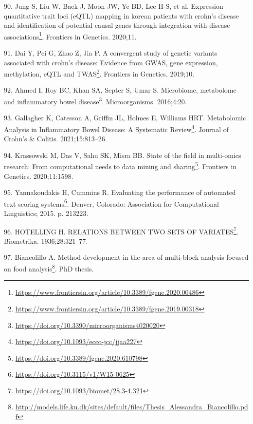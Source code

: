 \documentclass[
  a4paper,
]{book}
\DeclareRobustCommand{\href}[2]{#2\footnote{\url{#1}}}
\newlength{\cslhangindent}
\newlength{\cslentryspacingunit} %
\newenvironment{CSLReferences}[2] %
 {%
  \setlength{\parindent}{0pt}
  \ifodd #1
  \let\oldpar\par
  \def\par{\hangindent=\cslhangindent\oldpar}
  \fi
  \setlength{\parskip}{#2\cslentryspacingunit}
 }%
 {}
\begin{document}
\begin{CSLReferences}{0}{0}
\leavevmode{}%
90. Jung S, Liu W, Baek J, Moon JW, Ye BD, Lee H-S, et al. \href{https://www.frontiersin.org/article/10.3389/fgene.2020.00486}{Expression quantitative trait loci (eQTL) mapping in korean patients with crohn{'}s disease and identification of potential causal genes through integration with disease associations}. Frontiers in Genetics. 2020;11.

\leavevmode{}%
91. Dai Y, Pei G, Zhao Z, Jia P. \href{https://www.frontiersin.org/article/10.3389/fgene.2019.00318}{A convergent study of genetic variants associated with crohn{'}s disease: Evidence from GWAS, gene expression, methylation, eQTL and TWAS}. Frontiers in Genetics. 2019;10.

\leavevmode{}%
92. Ahmed I, Roy BC, Khan SA, Septer S, Umar S. \href{https://doi.org/10.3390/microorganisms4020020}{Microbiome, metabolome and inflammatory bowel disease}. Microorganisms. 2016;4:20.

\leavevmode{}%
93. Gallagher K, Catesson A, Griffin JL, Holmes E, Williams HRT. \href{https://doi.org/10.1093/ecco-jcc/jjaa227}{Metabolomic Analysis in Inflammatory Bowel Disease: A Systematic Review}. Journal of Crohn's \& Colitis. 2021;15:813--26.

\leavevmode{}%
94. Krassowski M, Das V, Sahu SK, Misra BB. \href{https://doi.org/10.3389/fgene.2020.610798}{State of the field in multi-omics research: From computational needs to data mining and sharing}. Frontiers in Genetics. 2020;11:1598.

\leavevmode{}%
95. Yannakoudakis H, Cummins R. \href{https://doi.org/10.3115/v1/W15-0625}{Evaluating the performance of automated text scoring systems}. Denver, Colorado: Association for Computational Linguistics; 2015. p. 213223.

\leavevmode{}%
96. HOTELLING H. \href{https://doi.org/10.1093/biomet/28.3-4.321}{{RELATIONS BETWEEN TWO SETS OF VARIATES}}. Biometrika. 1936;28:321--77.

\leavevmode{}%
97. Biancolillo A. \href{http://models.life.ku.dk/sites/default/files/Thesis_Alessandra_Biancolillo.pdf}{Method development in the area of multi-block analysis focused on food analysis}. PhD thesis.


\end{CSLReferences}
\end{document}
